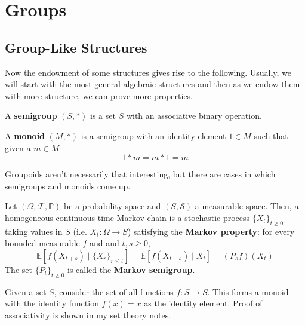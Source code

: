 \section{Groups} 

\subsection{Group-Like Structures} 

  Now the endowment of some structures gives rise to the following. Usually, we will start with the most general algebraic structures and then as we endow them with more structure, we can prove more properties. 

  \begin{definition}[Semigroup]
    A \textbf{semigroup} $(S, *)$ is a set $S$ with an associative binary operation. 
  \end{definition} 

  \begin{definition}[Monoid]
    A \textbf{monoid} $(M, *)$ is a semigroup with an identity element $1 \in M$ such that given a $m \in M$
    \begin{equation}
      1 * m = m * 1 = m
    \end{equation}
  \end{definition}

  Groupoids aren't necessarily that interesting, but there are cases in which semigroups and monoids come up. 

  \begin{example}
    Let $(\Omega, \mathcal{F}, \mathbb{P})$ be a probability space and $(S, \mathcal{S})$ a measurable space. Then, a homogeneous continuous-time Markov chain is a stochastic process $\{X_t\}_{t \geq 0}$ taking values in $S$ (i.e. $X_t: \Omega \rightarrow S$) satisfying the \textbf{Markov property}: for every bounded measurable $f$ and and $t, s \geq 0$, 
    \begin{equation}
      \mathbb{E}[ f(X_{t + s}) \mid \{X_r\}_{r \leq t} ] = \mathbb{E}[ f(X_{t + s}) \mid X_t ] = (P_s f)(X_t)
    \end{equation}
    The set $\{P_t\}_{t \geq 0}$ is called the \textbf{Markov semigroup}. 
  \end{example} 

  \begin{example}
    Given a set $S$, consider the set of all functions $f: S \rightarrow S$. This forms a monoid with the identity function $f(x) = x$ as the identity element. Proof of associativity is shown in my set theory notes. 
  \end{example} 

